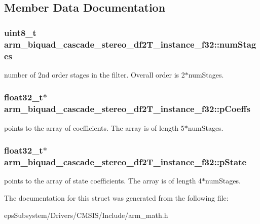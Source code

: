 \subsection{Member Data Documentation}
\hypertarget{structarm__biquad__cascade__stereo__df2_t__instance__f32_a5655328252da5c2c2425ceed253bc4f1}{
\subsubsection[{num\-Stages}]{\setlength{\rightskip}{0pt plus 5cm}uint8\-\_\-t arm\-\_\-biquad\-\_\-cascade\-\_\-stereo\-\_\-df2\-T\-\_\-instance\-\_\-f32\-::num\-Stages}}\label{structarm__biquad__cascade__stereo__df2_t__instance__f32_a5655328252da5c2c2425ceed253bc4f1}
number of 2nd order stages in the filter. Overall order is 2$\ast$num\-Stages. \hypertarget{structarm__biquad__cascade__stereo__df2_t__instance__f32_a58b15644de62a632c5e9d4a563569dc6}{
\subsubsection[{p\-Coeffs}]{\setlength{\rightskip}{0pt plus 5cm}float32\-\_\-t$\ast$ arm\-\_\-biquad\-\_\-cascade\-\_\-stereo\-\_\-df2\-T\-\_\-instance\-\_\-f32\-::p\-Coeffs}}\label{structarm__biquad__cascade__stereo__df2_t__instance__f32_a58b15644de62a632c5e9d4a563569dc6}
points to the array of coefficients. The array is of length 5$\ast$num\-Stages. \hypertarget{structarm__biquad__cascade__stereo__df2_t__instance__f32_a2cb00048bb1fe957a03c1ff56dfaf8f0}{
\subsubsection[{p\-State}]{\setlength{\rightskip}{0pt plus 5cm}float32\-\_\-t$\ast$ arm\-\_\-biquad\-\_\-cascade\-\_\-stereo\-\_\-df2\-T\-\_\-instance\-\_\-f32\-::p\-State}}\label{structarm__biquad__cascade__stereo__df2_t__instance__f32_a2cb00048bb1fe957a03c1ff56dfaf8f0}
points to the array of state coefficients. The array is of length 4$\ast$num\-Stages. 

The documentation for this struct was generated from the following file\-:\begin{DoxyCompactItemize}
\item 
eps\-Subsystem/\-Drivers/\-C\-M\-S\-I\-S/\-Include/arm\-\_\-math.\-h\end{DoxyCompactItemize}
